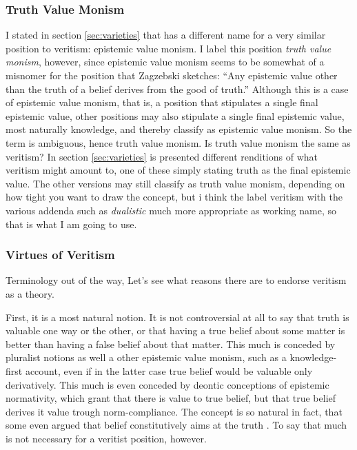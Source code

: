 \documentclass[12pt,numbers=noenddot]{scrartcl}
\begin{document}
\subsubsection{ Truth Value Monism }
I stated in section \ref{sec:varieties} that \textcite[191]{Zagzebski2004-ZAGEVM-2} has a different name for a very similar position to veritism: epistemic value monism. I label this position \emph{truth value monism}, however, since epistemic value monism seems to be somewhat of a misnomer for the position that Zagzebski sketches: “Any epistemic value other than the truth of a belief derives from the good of truth.” Although this is a case of epistemic value monism, that is, a position that stipulates a single final epistemic value, other positions may also stipulate a single final epistemic value, most naturally knowledge, and thereby classify as epistemic value monism. So the term is ambiguous, hence truth value monism.
Is truth value monism the same as veritism? In section \ref{sec:varieties} is presented different renditions of what veritism might amount to, one of these simply stating truth as the final epistemic value. The other versions may still classify as truth value monism, depending on how tight you want to draw the concept, but i think the label veritism with the various addenda such as \emph{dualistic} much more appropriate as working name, so that is what I am going to use.

\subsubsection { Virtues of Veritism }
Terminology out of the way, Let's see what reasons there are to endorse veritism as a theory.

First, it is a most natural notion. It is not controversial at all to say that truth is valuable one way or the other, or that having a true belief about some matter is better than having a false belief about that matter. This much is conceded by pluralist notions as well a other epistemic value monism, such as a knowledge-first account, even if in the latter case true belief would be valuable only derivatively. This much is even conceded by deontic conceptions of epistemic normativity, which grant that there is value to true belief, but that true belief derives it value trough norm-compliance. The concept is so natural in fact, that some even argued that belief constitutively aims at the truth \autocite{Shah2003-SHAHTG,Velleman2000-VELOTA}. To say that much is not necessary for a veritist position, however.
\end{document}
